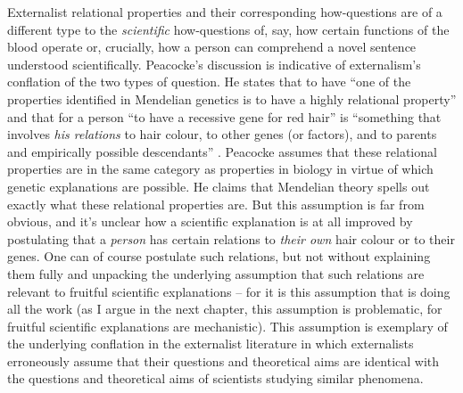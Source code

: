 Externalist relational properties and their corresponding how-questions are of a different type to the \textit{scientific} how-questions of, say, how certain functions of the blood operate or, crucially, how a person can comprehend a novel sentence understood scientifically. Peacocke’s discussion is indicative of externalism’s conflation of the two types of question. He states that to have “one of the properties identified in Mendelian genetics is to have a highly relational property” and that for a person “to have a recessive gene for red hair” is “something that involves \textit{his relations} to hair colour, to other genes (or factors), and to parents and empirically possible descendants” \citep[315, emphasis mine]{Peacocke1994}. Peacocke assumes that these relational properties are in the same category as properties in biology in virtue of which genetic explanations are possible. He claims that Mendelian theory spells out exactly what these relational properties are. But this assumption is far from obvious, and it’s unclear how a scientific explanation is at all improved by postulating that a \textit{person} has certain relations to \textit{their own} hair colour or to their genes. One can of course postulate such relations, but not without explaining them fully and unpacking the underlying assumption that such relations are relevant to fruitful scientific explanations – for it is this assumption that is doing all the work (as I argue in the next chapter, this assumption is problematic, for fruitful scientific explanations are mechanistic). This assumption is exemplary of the underlying conflation in the externalist literature in which externalists erroneously assume that their questions and theoretical aims are identical with the questions and theoretical aims of scientists studying similar phenomena.


